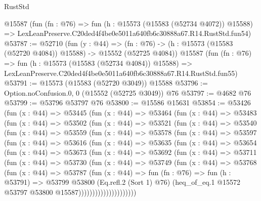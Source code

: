 \begin{lexlean}{RustStd}
\begin{coremodule}
    @15587
    (fun (fn : @76) =>
    fun (h : @15573 (@15583 (@52734 @4072)) @15588) =>
    LexLeanPreserve.C20ded4f4be0e5011a640fb6c30888a67.R14.RustStd.fun54)
@53787 := @52710
    (fun (y : @44) =>
    (fn : @76) -> (h : @15573 (@15583 (@52720 @4084)) @15588) -> @15552 (@52725 @4084))
    @15587
    (fun (fn : @76) =>
    fun (h : @15573 (@15583 (@52734 @4084)) @15588) =>
    LexLeanPreserve.C20ded4f4be0e5011a640fb6c30888a67.R14.RustStd.fun55)
@53791 := @15573 (@15583 (@52720 @3049)) @15588
@53796 := Option.noConfusion.{0, 0} (@15552 (@52725 @3049)) @76
@53797 := @4682 @76
@53799 := @53796 @53797 @76
@53800 := @15586 @15631
@53854 := @53426
    (fun (x : @44) =>
    @53445
      (fun (x : @44) =>
      @53464
        (fun (x : @44) =>
        @53483
          (fun (x : @44) =>
          @53502
            (fun (x : @44) =>
            @53521
              (fun (x : @44) =>
              @53540
                (fun (x : @44) =>
                @53559
                  (fun (x : @44) =>
                  @53578
                    (fun (x : @44) =>
                    @53597
                      (fun (x : @44) =>
                      @53616
                        (fun (x : @44) =>
                        @53635
                          (fun (x : @44) =>
                          @53654
                            (fun (x : @44) =>
                            @53673
                              (fun (x : @44) =>
                              @53692
                                (fun (x : @44) =>
                                @53711
                                  (fun (x : @44) =>
                                  @53730
                                    (fun (x : @44) =>
                                    @53749
                                      (fun (x : @44) =>
                                      @53768
                                        (fun (x : @44) =>
                                        @53787
                                          (fun (x : @44) =>
                                          fun (fn : @76) =>
                                          fun (h : @53791) =>
                                          @53799
                                            @53800
                                            (Eq.refl.{2} (Sort 1) @76)
                                            (heq_of_eq.{1}
                                              @15572
                                              @53797
                                              @53800
                                              @15587)))))))))))))))))))))

\end{coremodule}
\end{lexlean}
